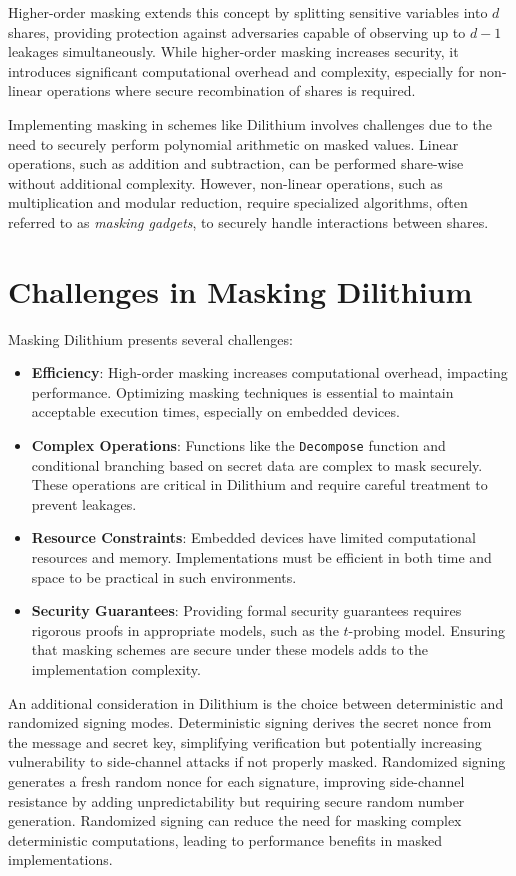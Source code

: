 Higher-order masking extends this concept by splitting sensitive variables into $d$ shares, providing protection against adversaries capable of observing up to $d - 1$ leakages simultaneously. While higher-order masking increases security, it introduces significant computational overhead and complexity, especially for non-linear operations where secure recombination of shares is required.

Implementing masking in schemes like Dilithium involves challenges due to the need to securely perform polynomial arithmetic on masked values. Linear operations, such as addition and subtraction, can be performed share-wise without additional complexity. However, non-linear operations, such as multiplication and modular reduction, require specialized algorithms, often referred to as \emph{masking gadgets}, to securely handle interactions between shares.

\section{Challenges in Masking Dilithium}

Masking Dilithium presents several challenges:

\begin{itemize}
    \item \textbf{Efficiency}: High-order masking increases computational overhead, impacting performance. Optimizing masking techniques is essential to maintain acceptable execution times, especially on embedded devices.
    \item \textbf{Complex Operations}: Functions like the \texttt{Decompose} function and conditional branching based on secret data are complex to mask securely. These operations are critical in Dilithium and require careful treatment to prevent leakages.
    \item \textbf{Resource Constraints}: Embedded devices have limited computational resources and memory. Implementations must be efficient in both time and space to be practical in such environments.
    \item \textbf{Security Guarantees}: Providing formal security guarantees requires rigorous proofs in appropriate models, such as the $t$-probing model. Ensuring that masking schemes are secure under these models adds to the implementation complexity.
\end{itemize}

An additional consideration in Dilithium is the choice between deterministic and randomized signing modes. Deterministic signing derives the secret nonce from the message and secret key, simplifying verification but potentially increasing vulnerability to side-channel attacks if not properly masked. Randomized signing generates a fresh random nonce for each signature, improving side-channel resistance by adding unpredictability but requiring secure random number generation. Randomized signing can reduce the need for masking complex deterministic computations, leading to performance benefits in masked implementations.

